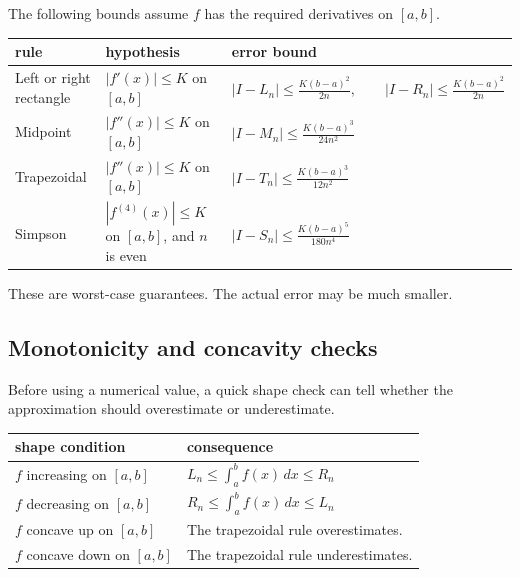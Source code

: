 The following bounds assume \(f\) has the required derivatives on \([a,b]\).

\begin{center}
\small
\renewcommand{\arraystretch}{2.0}
\begin{tabular}{p{}|p{}|p{}}
\textbf{rule} & \textbf{hypothesis} & \textbf{error bound} \\ \hline

Left or right rectangle &
\(\displaystyle |f'(x)|\le K\) on \([a,b]\) &
\(\displaystyle
|I-L_n|\le \frac{K(b-a)^2}{2n},
\qquad
|I-R_n|\le \frac{K(b-a)^2}{2n}
\) \\

Midpoint &
\(\displaystyle |f''(x)|\le K\) on \([a,b]\) &
\(\displaystyle
|I-M_n|\le \frac{K(b-a)^3}{24n^2}
\) \\

Trapezoidal &
\(\displaystyle |f''(x)|\le K\) on \([a,b]\) &
\(\displaystyle
|I-T_n|\le \frac{K(b-a)^3}{12n^2}
\) \\

Simpson &
\(\displaystyle |f^{(4)}(x)|\le K\) on \([a,b]\), and \(n\) is even &
\(\displaystyle
|I-S_n|\le \frac{K(b-a)^5}{180n^4}
\)
\end{tabular}
\end{center}

These are worst-case guarantees.  The actual error may be much smaller.

\subsection{Monotonicity and concavity checks}
\label{appsubsec:monotonicity-concavity-numerical-checks}

Before using a numerical value, a quick shape check can tell whether the approximation
should overestimate or underestimate.

\begin{center}
\renewcommand{\arraystretch}{1.7}
\begin{tabular}{p{}|p{}}
\textbf{shape condition} & \textbf{consequence} \\ \hline

\(f\) increasing on \([a,b]\) &
\(\displaystyle L_n\le \int_a^b f(x)\,dx\le R_n\) \\

\(f\) decreasing on \([a,b]\) &
\(\displaystyle R_n\le \int_a^b f(x)\,dx\le L_n\) \\

\(f\) concave up on \([a,b]\) &
The trapezoidal rule overestimates. \\

\(f\) concave down on \([a,b]\) &
The trapezoidal rule underestimates.
\end{tabular}
\end{center}

